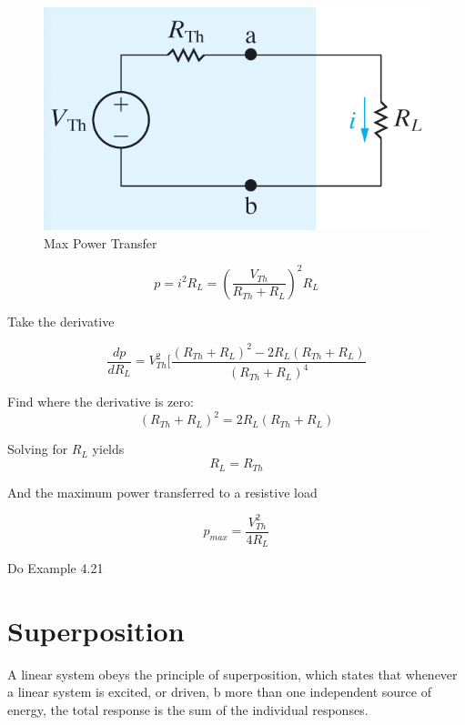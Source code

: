 \documentclass[14pt]{memoir}
\begin{document}
\begin{figure}[H]
\begin{center}
\includegraphics[scale=0.50]{fig/fig04_64.png}
\caption{Max Power Transfer}
\label{fig:fig04_64}
\end{center}
\end{figure}

\begin{equation}
p = i^2 R_L = (\frac{V_{Th}}{R_{Th} + R_L})^2 R_L
\end{equation}

Take the derivative

\begin{equation}
\frac{dp}{dR_L} = V^2_{Th} [\frac{(R_{Th} + R_L)^2 - 2 R_L (R_{Th} + R_L)}{(R_{Th} + R_L)^4}
\end{equation}

Find where the derivative is zero:
\begin{equation}
(R_{Th} + R_L)^2 = 2 R_L (R_{Th} + R_L)
\end{equation}

Solving for $R_L$ yields
\begin{equation}
R_L = R_{Th}
\end{equation}

And the maximum power transferred to a resistive load

\begin{equation}
p_{max} = \frac{V^2_{Th}}{4 R_L}
\end{equation}

\begin{tcolorbox}
Do Example 4.21
\end{tcolorbox}

\section{Superposition}
A linear system obeys the principle of superposition, which states that whenever a linear system is excited, or driven, b more than one independent source of energy, the total response is the sum of the individual responses. 
\end{document}
